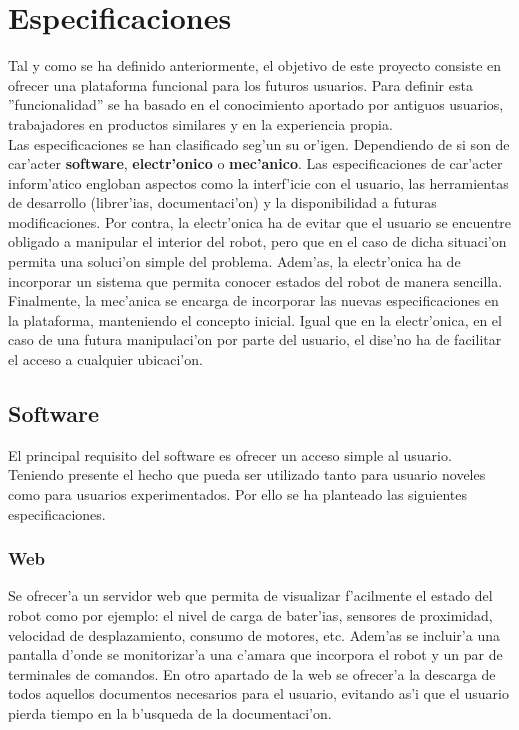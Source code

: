 \documentclass[twoside,12pt]{article}
\begin{document}
\newpage

\section{Especificaciones}
Tal y como se ha definido anteriormente, el objetivo de este proyecto consiste en ofrecer una plataforma funcional para los futuros usuarios. Para definir esta ''funcionalidad'' se ha basado en el conocimiento aportado por antiguos usuarios, trabajadores en productos similares y en la experiencia propia. \\

Las especificaciones se han clasificado seg'un su or'igen. Dependiendo de si son de car'acter \textbf{software}, \textbf{electr'onico} o \textbf{mec'anico}. Las especificaciones de car'acter inform'atico engloban aspectos como la interf'icie con el usuario, las herramientas de desarrollo (librer'ias, documentaci'on) y la disponibilidad a futuras modificaciones. Por contra, la electr'onica ha de evitar que el usuario se encuentre obligado a manipular el interior del robot, pero que en el caso de dicha situaci'on permita una soluci'on simple del problema. Adem'as, la electr'onica ha de incorporar un sistema que permita conocer estados del robot de manera sencilla. Finalmente, la mec'anica se encarga de incorporar las nuevas especificaciones en la plataforma, manteniendo el concepto inicial. Igual que en la electr'onica, en el caso de una futura manipulaci'on por parte del usuario, el dise'no ha de facilitar el acceso a cualquier ubicaci'on.

\subsection{Software}
El principal requisito del software es ofrecer un acceso simple al usuario. Teniendo presente el hecho que pueda ser utilizado tanto para usuario noveles como para usuarios experimentados. Por ello se ha planteado las siguientes especificaciones.

\subsubsection{Web}
Se ofrecer'a un servidor web que permita de visualizar f'acilmente el estado del robot como por ejemplo: el nivel de carga de bater'ias, sensores de proximidad, velocidad de desplazamiento, consumo de motores, etc. Adem'as se incluir'a una pantalla d'onde se monitorizar'a una c'amara que incorpora el robot y un par de terminales de comandos.
En otro apartado de la web se ofrecer'a la descarga de todos aquellos documentos necesarios para el usuario, evitando as'i que el usuario pierda tiempo en la b'usqueda de la documentaci'on.
\end{document}
